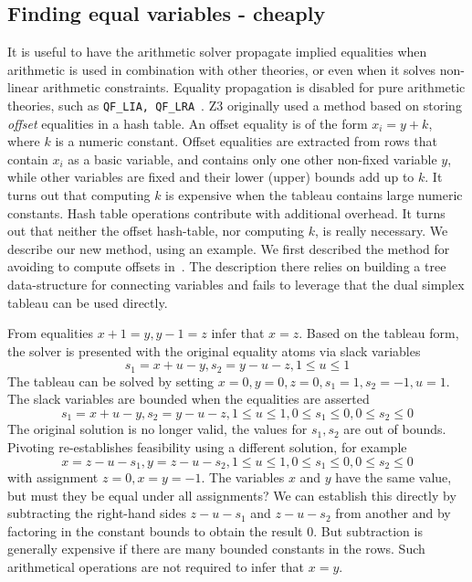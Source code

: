 \subsection{Finding equal variables - cheaply}
It is useful to have the arithmetic solver propagate implied equalities when arithmetic is used in combination with other theories, or even when
it solves non-linear arithmetic constraints. Equality propagation is disabled for pure arithmetic theories, such as {\tt QF\_LIA, QF\_LRA}~\cite{SMTLIB2}.
Z3 originally used a method based on storing \emph{offset} equalities in a hash table.
An offset equality is of the form $x_i = y + k$, where $k$ is a numeric constant.
Offset equalities are extracted from rows that contain $x_i$ as a basic variable, and contains
only one other non-fixed variable $y$, while other variables are fixed and their lower
(upper) bounds add up to $k$. It turns out that computing $k$ is
expensive when the tableau contains large numeric constants. Hash table operations
contribute with additional overhead. It turns out that neither the offset hash-table, nor computing $k$,
is really necessary. We describe our new method, using an example.
We first described the method for avoiding to compute offsets in~\cite{DBLP:conf/sbmf/BjornerN20}.
The description there relies on building a tree data-structure for connecting variables and fails to leverage that the dual simplex tableau can be
used directly.


\begin{example}

From equalities $x + 1 = y, y - 1 = z$ infer that $x = z$. Based on the tableau form, the solver is presented with the original equality atoms via slack variables
\[
    s_1 = x + u - y, s_2 = y - u - z, 1 \leq u \leq 1
    \]	
The tableau can be solved by setting $x = 0, y = 0, z = 0, s_1 = 1, s_2 = -1, u = 1$.
The slack variables are bounded when the equalities are asserted
\[
    s_1 = x + u - y, s_2 = y - u - z, 1 \leq u \leq 1, 0 \leq s_1 \leq 0, 0 \leq s_2 \leq 0
    \]
The original solution is no longer valid, the values for $s_1, s_2$ are out of bounds.
Pivoting re-establishes feasibility using a different solution, for example
\[
    x = z - u - s_1, y = z - u - s_2, 1 \leq u \leq 1, 0 \leq s_1 \leq 0, 0 \leq s_2 \leq 0
    \]
with assignment $z = 0, x = y = -1$. The variables $x$ and $y$ have the same value,
but must they be equal under all assignments? We can establish this directly by subtracting the
right-hand sides $z - u - s_1$ and $z - u - s_2$ from another and by factoring in the constant bounds to obtain
the result $0$. But subtraction is generally expensive if there are many bounded constants in the rows.
Such arithmetical operations are not required to infer that $x = y$.

\end{example}

